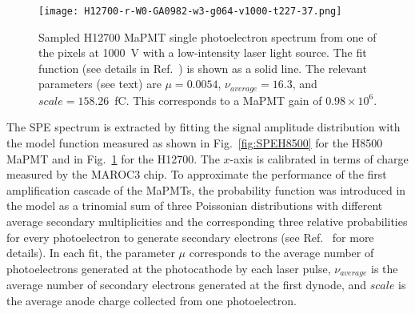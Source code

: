 \documentclass[5p,times,twocolumn]{elsarticle}
\def\MaPMT{MaPMT }
\begin{document}
\begin{figure}[ht]
	\centering
	\texttt{[image: H12700-r-W0-GA0982-w3-g064-v1000-t227-37.png]}
	\caption{Sampled H12700 \MaPMT single photoelectron spectrum from one of the pixels at 1000~V with a low-intensity
          laser light source. The fit function (see details in Ref.~\cite{Pavel}) is shown as a solid line. 
          The relevant parameters (see text) are $\mu=0.0054$, $\nu_{average}=16.3$, and $scale=158.26$~fC. This corresponds
          to a \MaPMT gain of $0.98 \times 10^6$.
          }
	\label{fig:SPEH12700}
\end{figure}

The SPE spectrum is extracted by fitting the signal amplitude distribution with the model function measured 
as shown in Fig.~\ref{fig:SPEH8500} for the H8500 MaPMT and in Fig.~\ref{fig:SPEH12700} for the H12700.
The $x$-axis is calibrated in terms of charge measured by the MAROC3 chip.
To approximate the performance of the first amplification cascade of the MaPMTs, the probability function
 was introduced in the model as a trinomial sum of three Poissonian distributions with different average secondary
multiplicities and the corresponding three relative probabilities for every photoelectron to generate secondary
electrons (see Ref.~\cite{Pavel} for more details).
In each fit, the parameter $\mu$ corresponds to the average number of photoelectrons generated at the photocathode by
each laser pulse, $\nu_{average}$ is the average number of secondary electrons generated at the first dynode, and $scale$ is the 
average anode charge collected from one photoelectron. 
\end{document}
